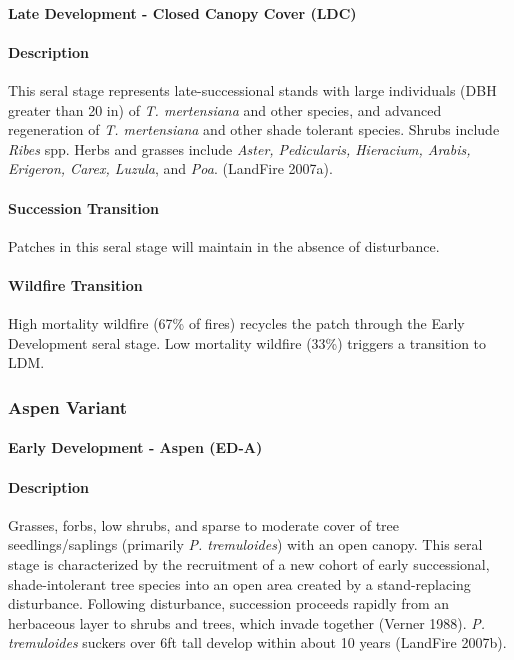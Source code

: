 \paragraph*{Late Development - Closed Canopy Cover (LDC)}

\paragraph*{Description} This seral stage represents late-successional stands with large individuals (DBH greater than 20 in) of \emph{T. mertensiana} and other species, and advanced regeneration of \emph{T. mertensiana} and other shade tolerant species. Shrubs include \emph{Ribes} spp. Herbs and grasses include \emph{Aster, Pedicularis, Hieracium, Arabis, Erigeron, Carex, Luzula}, and \emph{Poa}. (LandFire 2007a).

\paragraph*{Succession Transition} Patches in this seral stage will maintain in the absence of disturbance.

\paragraph*{Wildfire Transition} High mortality wildfire (67\% of fires) recycles the patch through the Early Development seral stage. Low mortality wildfire (33\%) triggers a transition to LDM. 

\noindent\hrulefill
\noindent\hrulefill

\subsubsection*{Aspen Variant}

\paragraph*{Early Development - Aspen (ED-A)}

\paragraph*{Description} Grasses, forbs, low shrubs, and sparse to moderate cover of tree seedlings/saplings (primarily \emph{P. tremuloides}) with an open canopy. This seral stage is characterized by the recruitment of a new cohort of early successional, shade-intolerant tree species into an open area created by a stand-replacing disturbance. Following disturbance, succession proceeds rapidly from an herbaceous layer to shrubs and trees, which invade together (Verner 1988). \emph{P. tremuloides} suckers over 6ft tall develop within about 10 years (LandFire 2007b). 


